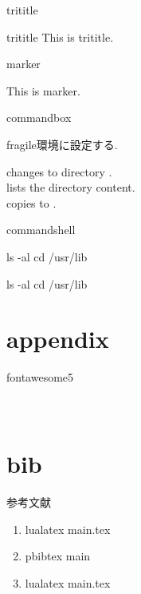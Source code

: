 \documentclass[aspectratio=169]{beamer}
\begin{document}
    \begin{frame}{trititle}{}
        \begin{trititle}{trititle}
            This is trititle.
        \end{trititle}
    \end{frame}

    \begin{frame}{marker}{}
        \begin{marker}
            This is marker.
        \end{marker}
    \end{frame}

    \begin{frame}[fragile]{commandbox}{}
        \begin{marker}
            fragile環境に設定する.
        \end{marker}
         changes to directory . \\
         lists the directory content. \\
         copies  to
        .
    \end{frame}

    \begin{frame}[fragile]{commandshell}{}
\begin{fullcommandshell}
ls -al
cd /usr/lib
\end{fullcommandshell}
\begin{commandshell}
    ls -al
    cd /usr/lib
\end{commandshell}
    \end{frame}

    \section{appendix}

    \begin{frame}[fragile]{fontawesome5}{}
        \faGithub \\
        \faRust \\
        \faPython \\

    \end{frame}

    \section*{bib}

    \begin{frame}{参考文献}{}
        \begin{enumerate}
            \item lualatex main.tex
            \item pbibtex main
            \item lualatex main.tex
        \end{enumerate}
        \beamertemplatetextbibitems
        
        
    \end{frame}
\end{document}
